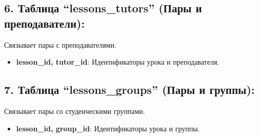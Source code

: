 \subsection*{6. Таблица ``lessons\_tutors'' (Пары и преподаватели):}
Связывает пары с преподавателями.
\begin{itemize}
    \item \textbf{lesson\_id, tutor\_id}: Идентификаторы урока и преподавателя.
\end{itemize}

\subsection*{7. Таблица ``lessons\_groups'' (Пары и группы):}
Связывает пары со студенческими группами.
\begin{itemize}
    \item \textbf{lesson\_id, group\_id}: Идентификаторы урока и группы.
\end{itemize}